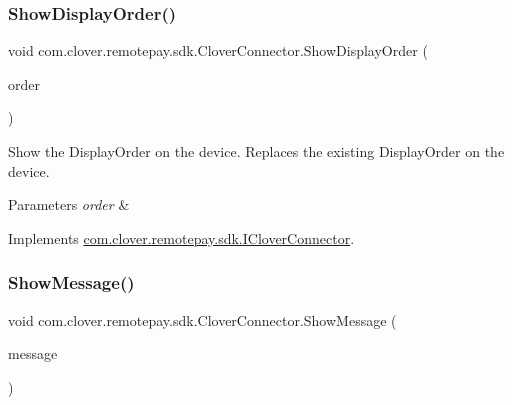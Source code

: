 \mbox{\label{classcom_1_1clover_1_1remotepay_1_1sdk_1_1_clover_connector_abfa384bfc0c016908d137e0332b7e06c}} 
\subsubsection{\texorpdfstring{Show\+Display\+Order()}{ShowDisplayOrder()}}
{\footnotesize\ttfamily void com.\+clover.\+remotepay.\+sdk.\+Clover\+Connector.\+Show\+Display\+Order (\begin{DoxyParamCaption}\item[{\hyperlink{classcom_1_1clover_1_1remote_1_1order_1_1_display_order}{Display\+Order}}]{order }\end{DoxyParamCaption})}



Show the Display\+Order on the device. Replaces the existing Display\+Order on the device. 


\begin{DoxyParams}{Parameters}
{\em order} & \\
\hline
\end{DoxyParams}


Implements \hyperlink{interfacecom_1_1clover_1_1remotepay_1_1sdk_1_1_i_clover_connector_a50be4c513f6f67971b51f6f76f30ac06}{com.\+clover.\+remotepay.\+sdk.\+I\+Clover\+Connector}.

\mbox{\label{classcom_1_1clover_1_1remotepay_1_1sdk_1_1_clover_connector_a6efd4dc87eaf16f949b9aeb93e7af464}} 
\subsubsection{\texorpdfstring{Show\+Message()}{ShowMessage()}}
{\footnotesize\ttfamily void com.\+clover.\+remotepay.\+sdk.\+Clover\+Connector.\+Show\+Message (\begin{DoxyParamCaption}\item[{string}]{message }\end{DoxyParamCaption})}



